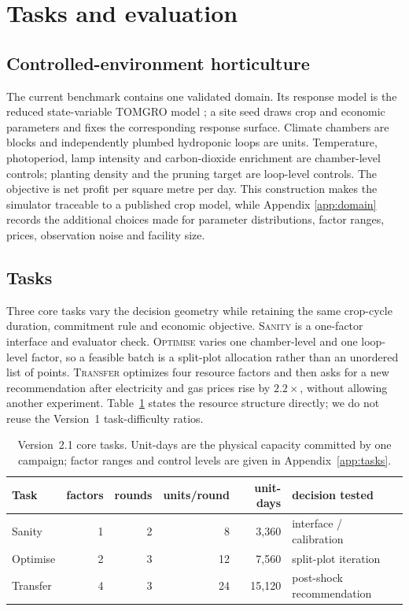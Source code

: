 \section{Tasks and evaluation}
\label{sec:tasks-eval}

\subsection{Controlled-environment horticulture}
\label{sec:domain}

The current benchmark contains one validated domain. Its response model is the reduced
state-variable TOMGRO model \citep{jones1999reduced}; a site seed draws crop and economic
parameters and fixes the corresponding response surface. Climate chambers are blocks and
independently plumbed hydroponic loops are units. Temperature, photoperiod, lamp intensity
and carbon-dioxide enrichment are chamber-level controls; planting density and the pruning
target are loop-level controls. The objective is net profit per square metre per day. This
construction makes the simulator traceable to a published crop model, while Appendix
\ref{app:domain} records the additional choices made for parameter distributions, factor
ranges, prices, observation noise and facility size.

\subsection{Tasks}
\label{sec:tasks}

Three core tasks vary the decision geometry while retaining the same crop-cycle duration,
commitment rule and economic objective. \textsc{Sanity} is a one-factor interface and
evaluator check. \textsc{Optimise} varies one chamber-level and one loop-level factor, so a
feasible batch is a split-plot allocation rather than an unordered list of points.
\textsc{Transfer} optimizes four resource factors and then asks for a new recommendation
after electricity and gas prices rise by $2.2\times$, without allowing another experiment.
Table~\ref{tab:tasks-v2} states the resource structure directly; we do not reuse the
Version~1 task-difficulty ratios.

\begin{table}[t]
\centering\small
\begin{tabular}{@{}lrrrrl@{}}
\toprule
Task & factors & rounds & units/round & unit-days & decision tested \\
\midrule
Sanity & 1 & 2 & 8  & 3,360  & interface / calibration \\
Optimise & 2 & 3 & 12 & 7,560  & split-plot iteration \\
Transfer & 4 & 3 & 24 & 15,120 & post-shock recommendation \\
\bottomrule
\end{tabular}
\caption{Version~2.1 core tasks. Unit-days are the physical capacity committed by one
campaign; factor ranges and control levels are given in Appendix~\ref{app:tasks}.}
\label{tab:tasks-v2}
\end{table}

